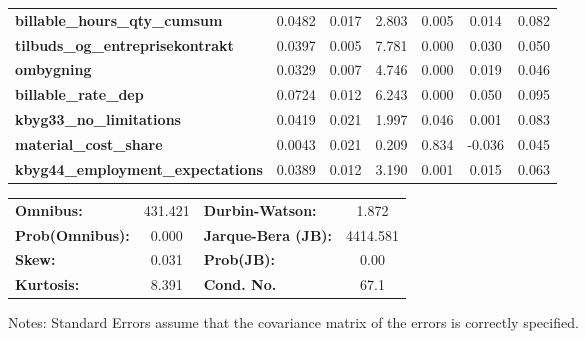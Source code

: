 \begin{center}
\begin{tabular}{lcccccc}
\textbf{billable\_hours\_qty\_cumsum}     &       0.0482  &        0.017     &     2.803  &         0.005        &        0.014    &        0.082     \\
\textbf{tilbuds\_og\_entreprisekontrakt}  &       0.0397  &        0.005     &     7.781  &         0.000        &        0.030    &        0.050     \\
\textbf{ombygning}                        &       0.0329  &        0.007     &     4.746  &         0.000        &        0.019    &        0.046     \\
\textbf{billable\_rate\_dep}              &       0.0724  &        0.012     &     6.243  &         0.000        &        0.050    &        0.095     \\
\textbf{kbyg33\_no\_limitations}          &       0.0419  &        0.021     &     1.997  &         0.046        &        0.001    &        0.083     \\
\textbf{material\_cost\_share}            &       0.0043  &        0.021     &     0.209  &         0.834        &       -0.036    &        0.045     \\
\textbf{kbyg44\_employment\_expectations} &       0.0389  &        0.012     &     3.190  &         0.001        &        0.015    &        0.063     \\
\bottomrule
\end{tabular}
\begin{tabular}{lclc}
\textbf{Omnibus:}       & 431.421 & \textbf{  Durbin-Watson:     } &    1.872  \\
\textbf{Prob(Omnibus):} &   0.000 & \textbf{  Jarque-Bera (JB):  } & 4414.581  \\
\textbf{Skew:}          &   0.031 & \textbf{  Prob(JB):          } &     0.00  \\
\textbf{Kurtosis:}      &   8.391 & \textbf{  Cond. No.          } &     67.1  \\
\bottomrule
\end{tabular}
\end{center}

Notes: \newline
 [1] Standard Errors assume that the covariance matrix of the errors is correctly specified.